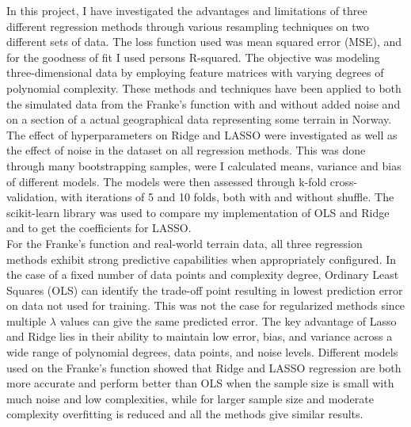 \documentclass[a4paper,12pt]{article}
\begin{document}
\noindent
In this project, I have investigated the advantages and limitations of three different regression methods through various resampling techniques on two different sets of data. The loss function used was mean squared error (MSE), and for the goodness of fit I used persons R-squared. The objective was modeling three-dimensional data by employing feature matrices with varying degrees of polynomial complexity. These methods and techniques have been applied to both the simulated data from the Franke's function with and without added noise and on a section of a actual geographical data representing some terrain in Norway. The effect of hyperparameters on Ridge and LASSO were investigated as well as the effect of noise in the dataset on all regression methods. This was done through many bootstrapping samples, were I calculated means, variance and bias of different models. The models were then assessed through k-fold cross-validation, with iterations of 5 and 10 folds, both with and without shuffle. The scikit-learn library was used to compare my implementation of OLS and Ridge and to get the coefficients for LASSO. \\

\noindent
For the Franke's function and real-world terrain data, all three regression methods exhibit strong predictive capabilities when appropriately configured. In the case of a fixed number of data points and complexity degree, Ordinary Least Squares (OLS) can identify the trade-off point resulting in lowest prediction error on data not used for training. This was not the case for regularized methods since multiple $\lambda$ values can give the same predicted error. The key advantage of Lasso and Ridge lies in their ability to maintain low error, bias, and variance across a wide range of polynomial degrees, data points, and noise levels. Different models used on the Franke's function showed that Ridge and LASSO regression are both more accurate and perform better than OLS when the sample size is small with much noise and low complexities, while for larger sample size and moderate complexity overfitting is reduced and all the methods give similar results.\\
\end{document}
